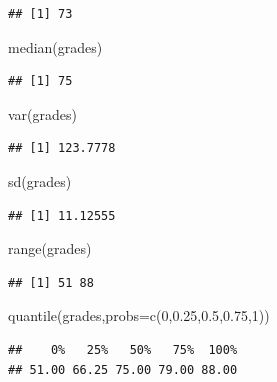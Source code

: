 \documentclass[
]{article}
\newcommand{\AttributeTok}[1]{\textcolor[rgb]{0.77,0.63,0.00}{#1}}
\newcommand{\DecValTok}[1]{\textcolor[rgb]{0.00,0.00,0.81}{#1}}
\newcommand{\FloatTok}[1]{\textcolor[rgb]{0.00,0.00,0.81}{#1}}
\newcommand{\FunctionTok}[1]{\textcolor[rgb]{0.00,0.00,0.00}{#1}}
\newcommand{\NormalTok}[1]{#1}
\begin{document}
\begin{verbatim}
## [1] 73
\end{verbatim}

\begin{Highlighting}[]
\FunctionTok{median}\NormalTok{(grades)}
\end{Highlighting}

\begin{verbatim}
## [1] 75
\end{verbatim}

\begin{Highlighting}[]
\FunctionTok{var}\NormalTok{(grades)}
\end{Highlighting}

\begin{verbatim}
## [1] 123.7778
\end{verbatim}

\begin{Highlighting}[]
\FunctionTok{sd}\NormalTok{(grades)}
\end{Highlighting}

\begin{verbatim}
## [1] 11.12555
\end{verbatim}

\begin{Highlighting}[]
\FunctionTok{range}\NormalTok{(grades)}
\end{Highlighting}

\begin{verbatim}
## [1] 51 88
\end{verbatim}

\begin{Highlighting}[]
\FunctionTok{quantile}\NormalTok{(grades,}\AttributeTok{probs=}\FunctionTok{c}\NormalTok{(}\DecValTok{0}\NormalTok{,}\FloatTok{0.25}\NormalTok{,}\FloatTok{0.5}\NormalTok{,}\FloatTok{0.75}\NormalTok{,}\DecValTok{1}\NormalTok{))}
\end{Highlighting}

\begin{verbatim}
##    0%   25%   50%   75%  100% 
## 51.00 66.25 75.00 79.00 88.00
\end{verbatim}
\end{document}
